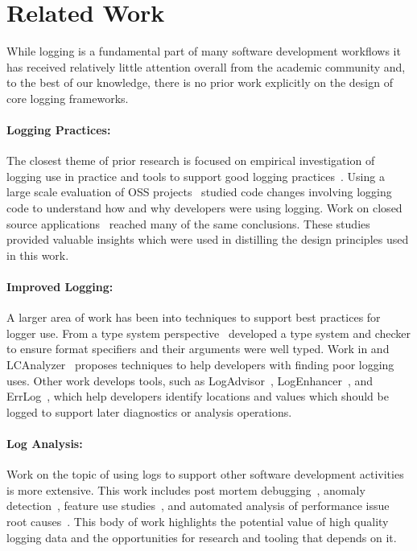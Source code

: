 \documentclass[sigplan,10pt]{acmart}
\begin{document}
\section{Related Work}
\label{sec:relwork}
While logging is a fundamental part of many software development workflows it has 
received relatively little attention overall from the academic community and, to the 
best of our knowledge, there is no prior work explicitly on the design of core 
logging frameworks. 

\paragraph{Logging Practices:}
\noindent
The closest theme of prior research is focused on empirical investigation of logging 
use in practice and tools to support good logging practices~\cite{logstudy,logstudy2}. 
Using a large scale evaluation of OSS projects~\cite{logstudy} studied code changes 
involving logging code to understand how and why developers were using logging. 
Work on closed source applications~\cite{logstudy2} reached many of the same conclusions. 
These studies provided valuable insights which were used in distilling the design 
principles used in this work.

\paragraph{Improved Logging:}
\noindent
A larger area of work has been into techniques to support best practices for 
logger use. From a type system perspective~\cite{tyepcheckprintf} developed 
a type system and checker to ensure format specifiers and their arguments were 
well typed. Work in and LCAnalyzer~\cite{logginganti} proposes 
techniques to help developers with finding poor logging 
uses. Other work develops tools, such as  LogAdvisor~\cite{learnlog}, LogEnhancer~\cite{LogEnhancer}, 
and ErrLog~\cite{ErrLog}, which help developers identify locations and values which should 
be logged to support later diagnostics or analysis operations.

\paragraph{Log Analysis:}
\noindent
Work on the topic of using logs to support other software development activities is 
more extensive. This work includes post mortem debugging~\cite{loganalysis,sherlog,autolog}, anomaly 
detection~\cite{detection}, feature use studies~\cite{twitter}, and automated analysis of performance 
issue root causes~\cite{performance}. 
This body of work highlights the potential value of high quality logging data and the 
opportunities for research and tooling that depends on it.
\end{document}
